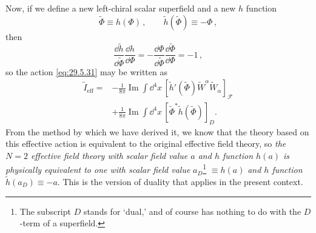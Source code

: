Now, if we define a new left-chiral scalar superfield and a new \(h\)
function
\begin{equation}
  \widetilde\Phi\equiv h(\Phi)\,,
  \qquad
  \widetilde h(\widetilde\Phi)\equiv-\Phi\,,
  \tag{29.5.32}\label{eq:29.5.32}
\end{equation}
then
\begin{equation}
  \frac{\dd\widetilde h}{\dd\widetilde\Phi}\frac{\dd h}{\dd\Phi}
  =-\frac{\dd\Phi}{\dd\widetilde\Phi}
    \frac{\dd\widetilde\Phi}{\dd\Phi}
  =-1\,,
  \tag{29.5.33}\label{eq:29.5.33}
\end{equation}
so the action \eqref{eq:29.5.31} may be written as
\begin{equation}
  \begin{aligned}
  \widetilde I_{\mathrm{eff}}
  ={}&-\frac{1}{8\pi}\operatorname{Im}\int \dd^4x\,
    \left[
      \widetilde h'(\widetilde\Phi)
      \widetilde W^\alpha\widetilde W_\alpha
    \right]_{\mathcal F}
  \\
  &+\frac{1}{8\pi}\operatorname{Im}\int \dd^4x\,
    \left[\widetilde\Phi^*\widetilde h(\widetilde\Phi)\right]_D.
  \end{aligned}
  \tag{29.5.34}\label{eq:29.5.34}
\end{equation}
From the method by which we have derived it, we know that the theory based on
this effective action is equivalent to the original effective field theory,
so \textit{the \(N=2\) effective field theory with scalar field value \(a\)
and \(h\) function \(h(a)\) is physically equivalent to one with scalar
field value} \(a_D\)\footnote{The subscript \(D\) stands for `dual,' and of
course has nothing to do with the \(D\)-term of a superfield.}
\(\equiv h(a)\) \textit{and \(h\) function}
\(\widetilde h(a_D)\equiv-a\). This is the version of duality that applies
in the present context.

